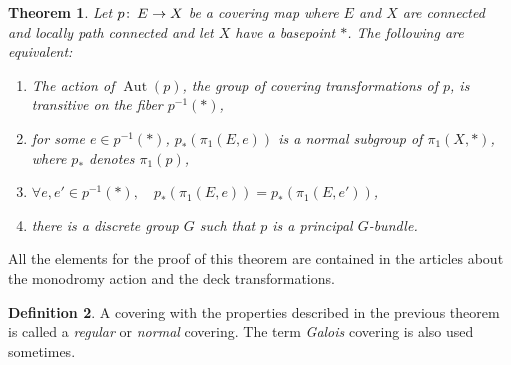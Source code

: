 \documentclass[12pt]{article}
\newtheorem{thm}{Theorem}
\theoremstyle{definition}
\newtheorem{defn}[thm]{Definition}
\theoremstyle{remark}
\numberwithin{equation}{subsection}
\newcommand{\Au}{ \operatorname{Aut}}
\def\co{\colon\thinspace}
\begin{document}
\begin{thm}
  Let $p\co E\to X$ be a covering map where $E$ and $X$ are connected and
  locally path connected and let $X$ have a basepoint $*$. The following are
  equivalent:
  \begin{enumerate}
  \item The action of $\Au(p)$, the group of covering transformations of
  $p$, is transitive on the fiber $p^{-1}(*)$,
  \item for some $e\in p^{-1}(*)$,  $p_*\left(\pi_1(E,e)\right)$ is a
  normal  subgroup of $\pi_1(X,*)$, where $p_*$
  denotes $\pi_1(p)$,
\item $\forall e,e'\in p^{-1}(*), \quad
  p_*\left(\pi_1(E,e)\right)=p_* \left(\pi_1(E,e')\right)$,
\item  there is a discrete group $G$ such that $p$ is a principal $G$-bundle.
  \end{enumerate}
\end{thm}
All the elements for the proof of this theorem are contained in the articles 
about the monodromy action and the deck transformations.
\begin{defn}
  A covering with the properties described in the previous theorem is called
  a \emph{regular} or \emph{normal} covering. The term \emph{Galois}
  covering is also used sometimes. 
\end{defn}
\end{document}
